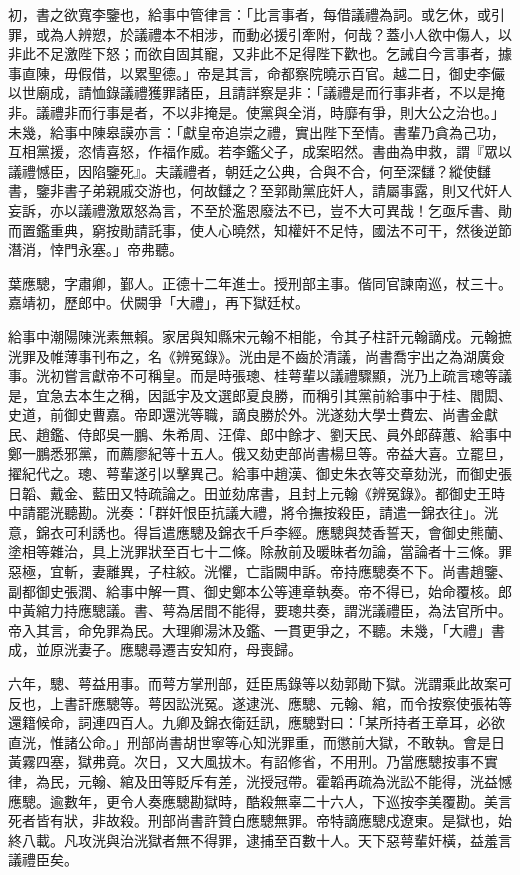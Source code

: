\begin{pinyinscope}
初，書之欲寬李鑒也，給事中管律言：「比言事者，每借議禮為詞。或乞休，或引罪，或為人辨愬，於議禮本不相涉，而動必援引牽附，何哉？蓋小人欲中傷人，以非此不足激陛下怒；而欲自固其寵，又非此不足得陛下歡也。乞誡自今言事者，據事直陳，毋假借，以累聖德。」帝是其言，命都察院曉示百官。越二日，御史李儼以世廟成，請恤錄議禮獲罪諸臣，且請詳察是非：「議禮是而行事非者，不以是掩非。議禮非而行事是者，不以非掩是。使黨與全消，時靡有爭，則大公之治也。」未幾，給事中陳皋謨亦言：「獻皇帝追崇之禮，實出陛下至情。書輩乃貪為己功，互相黨援，恣情喜怒，作福作威。若李鑑父子，成案昭然。書曲為申救，謂『眾以議禮憾臣，因陷鑒死』。夫議禮者，朝廷之公典，合與不合，何至深讎？縱使讎書，鑒非書子弟親戚交游也，何故讎之？至郭勛黨庇奸人，請屬事露，則又代奸人妄訴，亦以議禮激眾怒為言，不至於濫恩廢法不已，豈不大可異哉！乞亟斥書、勛而置鑑重典，窮按勛請託事，使人心曉然，知權奸不足恃，國法不可干，然後逆節潛消，悻門永塞。」帝弗聽。

葉應驄，字肅卿，鄞人。正德十二年進士。授刑部主事。偕同官諫南巡，杖三十。嘉靖初，歷郎中。伏闕爭「大禮」，再下獄廷杖。

給事中潮陽陳洸素無賴。家居與知縣宋元翰不相能，令其子柱訐元翰謫戍。元翰摭洸罪及帷薄事刊布之，名《辨冤錄》。洸由是不齒於清議，尚書喬宇出之為湖廣僉事。洸初嘗言獻帝不可稱皇。而是時張璁、桂萼輩以議禮驟顯，洸乃上疏言璁等議是，宜急去本生之稱，因詆宇及文選郎夏良勝，而稱引其黨前給事中于桂、閻閎、史道，前御史曹嘉。帝即還洸等職，謫良勝於外。洸遂劾大學士費宏、尚書金獻民、趙鑑、侍郎吳一鵬、朱希周、汪偉、郎中餘才、劉天民、員外郎薛蕙、給事中鄭一鵬悉邪黨，而薦廖紀等十五人。俄又劾吏部尚書楊旦等。帝益大喜。立罷旦，擢紀代之。璁、萼輩遂引以擊異己。給事中趙漢、御史朱衣等交章劾洸，而御史張日韜、戴金、藍田又特疏論之。田並劾席書，且封上元翰《辨冤錄》。都御史王時中請罷洸聽勘。洸奏：「群奸恨臣抗議大禮，將令撫按殺臣，請遣一錦衣往」。洸意，錦衣可利誘也。得旨遣應驄及錦衣千戶李經。應驄與焚香誓天，會御史熊蘭、塗相等雜治，具上洸罪狀至百七十二條。除赦前及暖昧者勿論，當論者十三條。罪惡極，宜斬，妻離異，子柱絞。洸懼，亡詣闕申訴。帝持應驄奏不下。尚書趙鑒、副都御史張潤、給事中解一貫、御史鄭本公等連章執奏。帝不得已，始命覆核。郎中黃綰力持應驄議。書、萼為居間不能得，要璁共奏，謂洸議禮臣，為法官所中。帝入其言，命免罪為民。大理卿湯沐及鑑、一貫更爭之，不聽。未幾，「大禮」書成，並原洸妻子。應驄尋遷吉安知府，母喪歸。

六年，驄、萼益用事。而萼方掌刑部，廷臣馬錄等以劾郭勛下獄。洸謂乘此故案可反也，上書訐應驄等。萼因訟洸冤。遂逮洸、應驄、元翰、綰，而令按察使張祐等還籍候命，詞連四百人。九卿及錦衣衛廷訊，應驄對曰：「某所持者王章耳，必欲直洸，惟諸公命。」刑部尚書胡世寧等心知洸罪重，而懲前大獄，不敢執。會是日黃霧四塞，獄弗竟。次日，又大風拔木。有詔修省，不用刑。乃當應驄按事不實律，為民，元翰、綰及田等貶斥有差，洸授冠帶。霍韜再疏為洸訟不能得，洸益憾應驄。逾數年，更令人奏應驄勘獄時，酷殺無辜二十六人，下巡按李美覆勘。美言死者皆有狀，非故殺。刑部尚書許贊白應驄無罪。帝特謫應驄戍遼東。是獄也，始終八載。凡攻洸與治洸獄者無不得罪，逮捕至百數十人。天下惡萼輩奸橫，益羞言議禮臣矣。


\end{pinyinscope}
